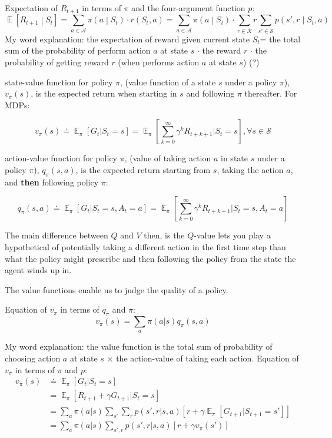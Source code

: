 \documentclass[lang=en,mode=geye,device=normal,color=blue,14pt]{elegantnote}
\DeclareMathOperator*{\E}{\mathbb{E}}
\DeclareMathOperator*{\1}{\mathbbm{1}}
\begin{document}
Expectation of $R_{t+1}$ in terms of $\pi$ and the four-argument function $p$:
\[
\E\left[R_{t+1} \middle|S_{t}\right] = \sum_{a \in \mathcal{A}} \pi\left(a \middle| S_t\right) \cdot r(S_t, a) = \sum_{a \in \mathcal{A}} \pi\left(a \middle| S_t\right) \cdot \sum_{r \in \mathcal{R}} r \sum_{s' \in \mathcal{S}} p\left(s', r \middle| S_t, a\right)
\]
My word explanation: the expectation of reward given current state $S_t$= the total sum of the probability of perform action $a$ at state $s$ $\cdot$ the reward $r$ $\cdot$ the probability of getting reward $r$ (when performs action $a$ at state $s$) (?)

\begin{definition}
state-value function for policy $\pi$, (value function of a state $s$ under a policy $\pi$), $v_{\pi}(s)$, is the expected return when starting in $s$ and following $\pi$ thereafter. For MDPs:

$$ v_\pi(s) \doteq \E_\pi[G_t | S_t = s] = \E_\pi [ \sum_{k=0}^{\infty} \gamma^k R_{t+k+1} | S_t = s], \forall s \in \mathcal{S} $$
\end{definition}

\begin{definition}
action-value function for policy $\pi$, (value of taking action $a$ in state $s$ under a policy $\pi$), $q_\pi(s,a)$, is the expected return starting from $s$, taking the action $a$, and \textbf{then} following policy $\pi$:

$$ q_\pi(s,a) \doteq \E_\pi [G_t | S_t = s, A_t = a] = \E_\pi [\sum_{k=0}^{\infty} \gamma^k R_{t+k+1} | S_t = s, A_t = a] $$
\end{definition}

The main difference between $Q$ and $V$ then, is the $Q$-value lets you play a hypothetical of potentially taking a different action in the first time step than what the policy might prescribe and then following the policy from the state the agent winds up in.

The value functions enable us to judge the quality of a policy.
\newline

Equation of $v_\pi$ in terms of $q_\pi$ and $\pi$:
$$ v_\pi(s) = \sum_a \pi(a|s)q_\pi(s,a) $$

My word explanation: the value function is the total sum of probability of choosing action $a$ at state $s$ $\times$ the action-value of taking each action.
\newline
Equation of $v_\pi$ in terms of $\pi$ and $p$:
\begin{align*}
v_\pi(s) & \doteq \E_\pi[G_t | S_t = s]\\
& = \E_\pi[R_{t+1} + \gamma G_{t+1} | S_t = s]\\
& = \sum_a \pi(a|s) \sum_{s'}\sum_r p(s',r|s,a) [r+ \gamma \E_\pi[G_{t+1} | S_{t+1}=s']]\\
& = \sum_a \pi(a|s) \sum_{s',r} p(s',r|s,a) [r+ \gamma v_\pi(s')]
\end{align*}
\end{document}
